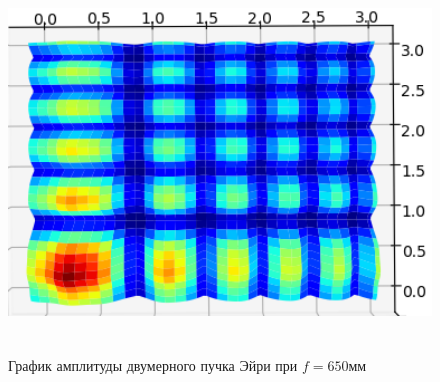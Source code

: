 {\vspace{0.6cm}

\begin{figure}[H]
	\centering
\includegraphics[height = 10cm]{plots/ai3d}
\vspace{0.4cm}
\caption{График амплитуды двумерного пучка Эйри при $f = 650$мм}
	\label{ai3d}
\end{figure}
	}

	
		\newpage
	\titleformat{\section}{\bfseries\centering}{\thesection}{0.5em}{\MakeUppercase}

